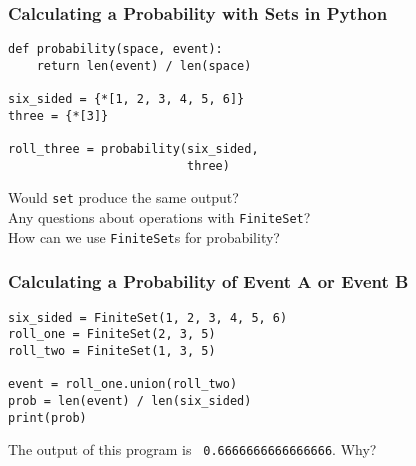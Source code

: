 \documentclass[14pt,aspectratio=169]{beamer}
\begin{document}
%
\begin{frame}[fragile]
  \frametitle{Calculating a Probability with Sets in Python}
  \normalsize
  \begin{minipage}{6in}
    \vspace*{.25in}
    \begin{verbatim}
def probability(space, event):
    return len(event) / len(space)

six_sided = {*[1, 2, 3, 4, 5, 6]}
three = {*[3]}

roll_three = probability(six_sided,
                         three)
    \end{verbatim}
  \end{minipage}
  \vspace*{.25in}
  \begin{center}
    \normalsize \noindent Would {\tt set} produce the same output? \\
    \normalsize \noindent Any questions about operations with {\tt FiniteSet}? \\
    \normalsize \noindent How can we use {\tt FiniteSet}s for probability? \\
  \end{center}
\end{frame}

%
\begin{frame}[fragile]
  \frametitle{Calculating a Probability of Event A or Event B}
  \normalsize
  \begin{minipage}{6in}
    \vspace*{.25in}
    \begin{verbatim}
six_sided = FiniteSet(1, 2, 3, 4, 5, 6)
roll_one = FiniteSet(2, 3, 5)
roll_two = FiniteSet(1, 3, 5)

event = roll_one.union(roll_two)
prob = len(event) / len(six_sided)
print(prob)
    \end{verbatim}
  \end{minipage}
  \vspace*{.05in}
  \begin{center}
    \normalsize \noindent The output of this program is {\tt
    0.6666666666666666}. Why? \\
  \end{center}
\end{frame}
\end{document}
